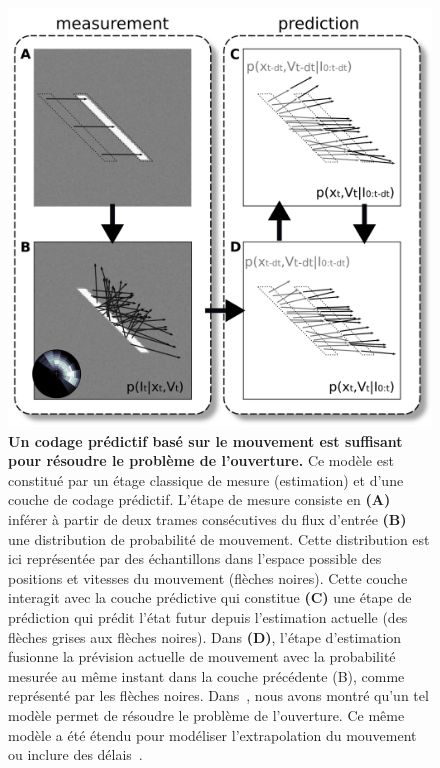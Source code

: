 \documentclass[11pt,french,a4paper,oneside]{article}%
\begin{document}
\begin{figure}%
\centerline{\includegraphics[width=\linewidth]{perrinet12pred_figure2.png}}
\caption{\textbf{Un codage prédictif basé sur le mouvement est suffisant pour résoudre le problème de l'ouverture.} 
Ce modèle est constitué par un étage classique de mesure (estimation) et d'une couche de codage prédictif. L'étape de mesure consiste en \textbf {(A)} inférer à partir de deux trames consécutives du flux d'entrée \textbf {(B)} une distribution de probabilité de mouvement. Cette distribution est ici représentée par des échantillons dans l'espace possible des positions et vitesses du mouvement (flèches noires). Cette couche interagit avec la couche prédictive qui constitue \textbf {(C)} une étape de prédiction qui prédit l'état futur depuis l'estimation actuelle (des flèches grises aux flèches noires). Dans \textbf {(D)}, l'étape d'estimation fusionne la prévision actuelle de mouvement avec la probabilité mesurée au même instant dans la couche précédente (B), comme représenté par les flèches noires. %
Dans~\citep{Perrinet12pred}, nous avons montré qu'un tel modèle permet de résoudre le problème de l'ouverture. %
Ce même modèle a été étendu pour modéliser l'extrapolation du mouvement~\citep{Khoei13jpp} ou inclure des délais~\citep{KhoeiMassonPerrinet17}.
%
 }%
\label{fig:perrinet12pred}%
\end{figure}%
\end{document}

